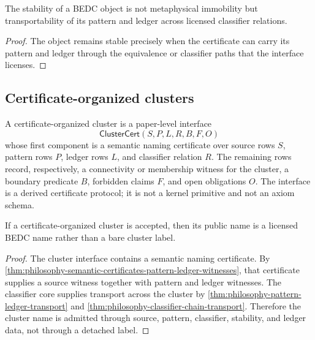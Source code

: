 \begin{corollary}
\label{cor:philosophy-object-stability-transportability}
The stability of a BEDC object is not metaphysical immobility but
transportability of its pattern and ledger across licensed classifier
relations.
\end{corollary}
\begin{proof}
The object remains stable precisely when the certificate can carry its
pattern and ledger through the equivalence or classifier paths that the
interface licenses.
\end{proof}

\subsection{Certificate-organized clusters}
\label{subsec:philosophy-certificate-organized-clusters}

\begin{definition}
\label{def:philosophy-certificate-organized-cluster}
A certificate-organized cluster is a paper-level interface
$$
\mathsf{ClusterCert}(S,P,L,R,B,F,O)
$$
whose first component is a semantic naming certificate over source
rows $S$, pattern rows $P$, ledger rows $L$, and classifier relation
$R$. The remaining rows record, respectively, a connectivity or
membership witness for the cluster, a boundary predicate $B$, forbidden
claims $F$, and open obligations $O$. The interface is a derived
certificate protocol; it is not a kernel primitive and not an axiom
schema.
\end{definition}

\begin{theorem}
\label{thm:philosophy-cluster-names-licensed}
If a certificate-organized cluster is accepted, then its public name is a
licensed BEDC name rather than a bare cluster label.
\end{theorem}
\begin{proof}
The cluster interface contains a semantic naming certificate. By
\autoref{thm:philosophy-semantic-certificates-pattern-ledger-witnesses},
that certificate supplies a source witness together with pattern and
ledger witnesses. The classifier core supplies transport across the
cluster by \autoref{thm:philosophy-pattern-ledger-transport} and
\autoref{thm:philosophy-classifier-chain-transport}. Therefore the
cluster name is admitted through source, pattern, classifier, stability,
and ledger data, not through a detached label.
\end{proof}

